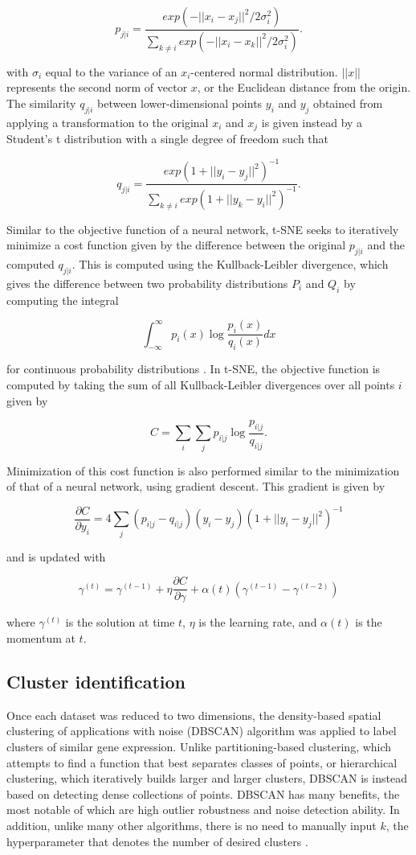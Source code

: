 \documentclass[12pt,oneside,onecolumn,a4paper]{article}
\begin{document}
$$p_{j|i}=\frac{exp(-||x_i-x_j||^2/2\sigma_i^2)}{\sum_{k\neq i}exp(-||x_i-x_k||^2/2\sigma_i^2)}.$$

\noindent
with $\sigma_{i}$ equal to the variance of an $x_{i}$-centered normal distribution. $||x||$ represents the second norm of vector $x$, or the Euclidean distance from the origin. The similarity $q_{j|i}$ between lower-dimensional points $y_i$ and $y_j$ obtained from applying a transformation to the original $x_i$ and $x_{j}$ is given instead by a Student's t distribution with a single degree of freedom such that

$$q_{j|i} = \frac{exp(1+||y_i-y_j||^2)^{-1}}{\sum_{k\neq i}exp(1+||y_k-y_i||^2)^{-1}}.$$

Similar to the objective function of a neural network, t-SNE seeks to iteratively minimize a cost function given by the difference between the original $p_{j|i}$ and the computed $q_{j|i}$. This is computed using the Kullback-Leibler divergence, which gives the difference between two probability distributions $P_{i}$ and $Q_{i}$ by computing the integral

$$\int_{-\infty}^{\infty}p_i(x) \log \frac{p_i(x)}{q_i(x)} dx$$

\noindent
for continuous probability distributions \citep{Bishoplearning}. In t-SNE, the objective function is computed by taking the sum of all Kullback-Leibler divergences over all points $i$ given by 

$$C=\sum_{i}\sum_{j}p_{i|j}\log \frac{p_{i|j}}{q_{i|j}}.$$

\noindent
Minimization of this cost function is also performed similar to the minimization of that of a neural network, using gradient descent. This gradient is given by

$$\frac{\partial C}{\partial y_i}=4\sum_{j}(p_{i|j}-q_{i|j})(y_i-y_j)(1+||y_i-y_j||^2)^{-1}$$

\noindent
and is updated with

$$\gamma^{(t)}=\gamma^{(t-1)}+\eta\frac{\partial C}{\partial \gamma}+\alpha(t)\left(\gamma^{(t-1)}-\gamma^{(t-2)}\right)$$

\noindent
where $\gamma^{(t)}$ is the solution at time $t$, $\eta$ is the learning rate, and $\alpha(t)$ is the momentum at $t$. 
\subsection{Cluster identification}

Once each dataset was reduced to two dimensions, the density-based spatial clustering of applications with noise (DBSCAN) algorithm was applied to label clusters of similar gene expression. Unlike partitioning-based clustering, which attempts to find a function that best separates classes of points, or hierarchical clustering, which iteratively builds larger and larger clusters, DBSCAN is instead based on detecting dense collections of points. DBSCAN has many benefits, the most notable of which are high outlier robustness and noise detection ability. In addition, unlike many other algorithms, there is no need to manually input $k$, the hyperparameter that denotes the number of desired clusters \citep{Ester1996ADA}.
\end{document}
